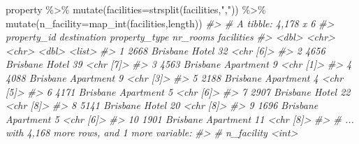 \documentclass[
]{book}
\newenvironment{Shaded}{\begin{snugshade}}{\end{snugshade}}
\newcommand{\AttributeTok}[1]{\textcolor[rgb]{0.77,0.63,0.00}{#1}}
\newcommand{\CommentTok}[1]{\textcolor[rgb]{0.56,0.35,0.01}{\textit{#1}}}
\newcommand{\FunctionTok}[1]{\textcolor[rgb]{0.00,0.00,0.00}{#1}}
\newcommand{\NormalTok}[1]{#1}
\newcommand{\SpecialCharTok}[1]{\textcolor[rgb]{0.00,0.00,0.00}{#1}}
\newcommand{\StringTok}[1]{\textcolor[rgb]{0.31,0.60,0.02}{#1}}
\begin{document}
\begin{Shaded}
\begin{Highlighting}[]
\NormalTok{property }\SpecialCharTok{\%\textgreater{}\%}
  \FunctionTok{mutate}\NormalTok{(}\AttributeTok{facilities=}\FunctionTok{strsplit}\NormalTok{(facilities,}\StringTok{","}\NormalTok{)) }\SpecialCharTok{\%\textgreater{}\%} 
  \FunctionTok{mutate}\NormalTok{(}\AttributeTok{n\_facility=}\FunctionTok{map\_int}\NormalTok{(facilities,length))}
\CommentTok{\#\textgreater{} \# A tibble: 4,178 x 6}
\CommentTok{\#\textgreater{}    property\_id destination property\_type nr\_rooms facilities}
\CommentTok{\#\textgreater{}          \textless{}dbl\textgreater{} \textless{}chr\textgreater{}       \textless{}chr\textgreater{}            \textless{}dbl\textgreater{} \textless{}list\textgreater{}    }
\CommentTok{\#\textgreater{}  1        2668 Brisbane    Hotel               32 \textless{}chr [6]\textgreater{} }
\CommentTok{\#\textgreater{}  2        4656 Brisbane    Hotel               39 \textless{}chr [7]\textgreater{} }
\CommentTok{\#\textgreater{}  3        4563 Brisbane    Apartment            9 \textless{}chr [1]\textgreater{} }
\CommentTok{\#\textgreater{}  4        4088 Brisbane    Apartment            9 \textless{}chr [3]\textgreater{} }
\CommentTok{\#\textgreater{}  5        2188 Brisbane    Apartment            4 \textless{}chr [5]\textgreater{} }
\CommentTok{\#\textgreater{}  6        4171 Brisbane    Apartment            5 \textless{}chr [6]\textgreater{} }
\CommentTok{\#\textgreater{}  7        2907 Brisbane    Hotel               22 \textless{}chr [8]\textgreater{} }
\CommentTok{\#\textgreater{}  8        5141 Brisbane    Hotel               20 \textless{}chr [8]\textgreater{} }
\CommentTok{\#\textgreater{}  9        1696 Brisbane    Apartment            5 \textless{}chr [6]\textgreater{} }
\CommentTok{\#\textgreater{} 10        1901 Brisbane    Apartment           11 \textless{}chr [8]\textgreater{} }
\CommentTok{\#\textgreater{} \# ... with 4,168 more rows, and 1 more variable:}
\CommentTok{\#\textgreater{} \#   n\_facility \textless{}int\textgreater{}}
\end{Highlighting}
\end{Shaded}


  
\end{document}
